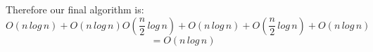 \documentclass[11pt, oneside]{article}   	%
\begin{document}
\begin{enumerate}
\begin{enumerate}
\begin{enumerate}
				Therefore our final algorithm is:
		\[ O(n\, log\, n) + O(n\, log\, n) O(\frac{n}{2}\, log\, n) + O(n\, log\, n) + O(\frac{n}{2}\, log\, n) + O(n\, log\, n)\]
		\[ = O( n\, log\, n ) \]

			\end{enumerate}			

	\end{enumerate}
\end{enumerate}
\end{document}
